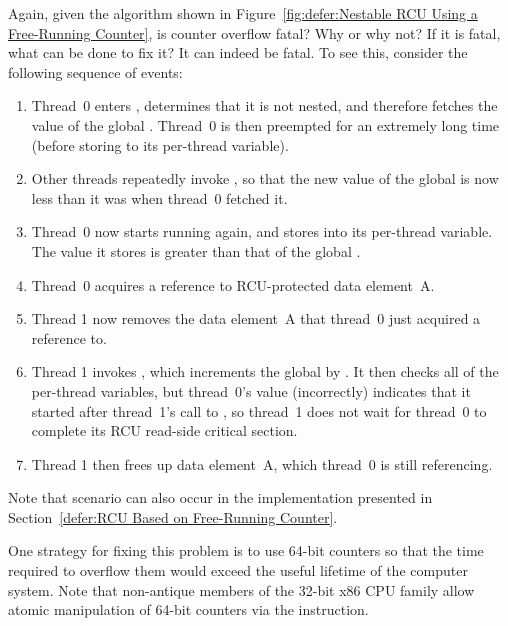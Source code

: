 \begin{enumerate}
\QuickQ{}
	Again, given the algorithm shown in
	Figure~\ref{fig:defer:Nestable RCU Using a Free-Running Counter},
	is counter overflow fatal?
	Why or why not?
	If it is fatal, what can be done to fix it?
\QuickA{}
	It can indeed be fatal.
	To see this, consider the following sequence of events:
	\begin{enumerate}
	\item	Thread~0 enters , determines
		that it is not nested, and therefore fetches the
		value of the global .
		Thread~0 is then preempted for an extremely long time
		(before storing to its per-thread 
		variable).
	\item	Other threads repeatedly invoke ,
		so that the new value of the global 
		is now 
		less than it was when thread~0 fetched it.
	\item	Thread~0 now starts running again, and stores into
		its per-thread  variable.
		The value it stores is
		greater than that of the global .
	\item	Thread~0 acquires a reference to RCU-protected data
		element~A.
	\item	Thread 1 now removes the data element~A that thread~0
		just acquired a reference to.
	\item	Thread 1 invokes , which
		increments the global  by
		.
		It then checks all of the per-thread 
		variables, but thread~0's value (incorrectly) indicates
		that it started after thread~1's call to
		, so thread~1 does not wait
		for thread~0 to complete its RCU read-side critical
		section.
	\item	Thread 1 then frees up data element~A, which thread~0
		is still referencing.
	\end{enumerate}

	Note that scenario can also occur in the implementation presented in
	Section~\ref{defer:RCU Based on Free-Running Counter}.

	One strategy for fixing this problem is to use 64-bit
	counters so that the time required to overflow them would exceed
	the useful lifetime of the computer system.
	Note that non-antique members of the 32-bit x86 CPU family
	allow atomic manipulation of 64-bit counters via the
	 instruction.


\end{enumerate}
